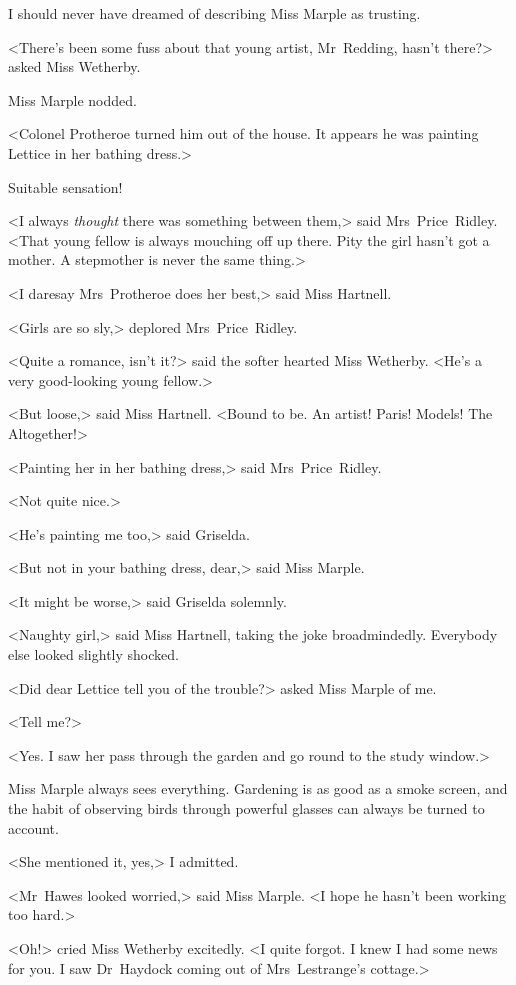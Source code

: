 I should never have dreamed of describing Miss Marple as trusting.

<There's been some fuss about that young artist, Mr~Redding, hasn't there?> asked Miss Wetherby.

Miss Marple nodded.

<Colonel Protheroe turned him out of the house. It appears he was painting Lettice in her bathing dress.>

Suitable sensation!

<I always \textit{thought} there was something between them,> said Mrs~Price~Ridley. <That young fellow is always mouching off up there. Pity the girl hasn't got a mother. A stepmother is never the same thing.>

<I daresay Mrs~Protheroe does her best,> said Miss Hartnell.

<Girls are so sly,> deplored Mrs~Price~Ridley.

<Quite a romance, isn't it?> said the softer hearted Miss Wetherby. <He's a very good-looking young fellow.>

<But loose,> said Miss Hartnell. <Bound to be. An artist! Paris! Models! The Altogether!>

<Painting her in her bathing dress,> said Mrs~Price~Ridley.

<Not quite nice.>

<He's painting me too,> said Griselda.

<But not in your bathing dress, dear,> said Miss Marple.

<It might be worse,> said Griselda solemnly.

<Naughty girl,> said Miss Hartnell, taking the joke broadmindedly. Everybody else looked slightly shocked.

<Did dear Lettice tell you of the trouble?> asked Miss Marple of me.

<Tell me?>

<Yes. I saw her pass through the garden and go round to the study window.>

Miss Marple always sees everything. Gardening is as good as a smoke screen, and the habit of observing birds through powerful glasses can always be turned to account.

<She mentioned it, yes,> I admitted.

<Mr~Hawes looked worried,> said Miss Marple. <I hope he hasn't been working too hard.>

<Oh!> cried Miss Wetherby excitedly. <I quite forgot. I knew I had some news for you. I saw Dr~Haydock coming out of Mrs~Lestrange's cottage.>

